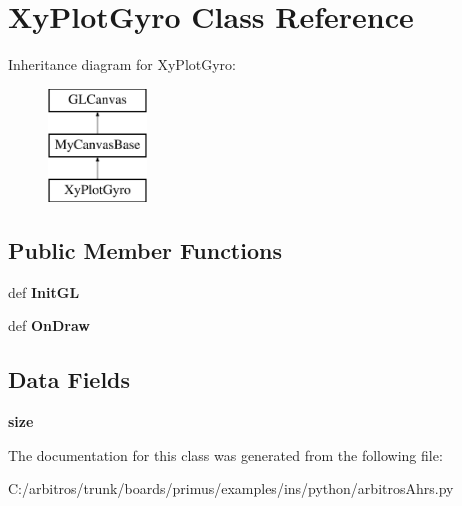 \hypertarget{classarbitros_ahrs_1_1_xy_plot_gyro}{\section{Xy\-Plot\-Gyro Class Reference}
\label{classarbitros_ahrs_1_1_xy_plot_gyro}
}
Inheritance diagram for Xy\-Plot\-Gyro\-:\begin{figure}[H]
\begin{center}
\leavevmode
\includegraphics[height=3.000000cm]{classarbitros_ahrs_1_1_xy_plot_gyro}
\end{center}
\end{figure}
\subsection*{Public Member Functions}
\begin{DoxyCompactItemize}
\item 
\hypertarget{classarbitros_ahrs_1_1_xy_plot_gyro_aa5d4da6894799e330c531fcff2320723}{def {\bfseries Init\-G\-L}}\label{classarbitros_ahrs_1_1_xy_plot_gyro_aa5d4da6894799e330c531fcff2320723}

\item 
\hypertarget{classarbitros_ahrs_1_1_xy_plot_gyro_a06264628fa709c57ac53fe3f63080317}{def {\bfseries On\-Draw}}\label{classarbitros_ahrs_1_1_xy_plot_gyro_a06264628fa709c57ac53fe3f63080317}

\end{DoxyCompactItemize}
\subsection*{Data Fields}
\begin{DoxyCompactItemize}
\item 
\hypertarget{classarbitros_ahrs_1_1_xy_plot_gyro_aa3d6656320f1a7278c0c2c7fdf07617c}{{\bfseries size}}\label{classarbitros_ahrs_1_1_xy_plot_gyro_aa3d6656320f1a7278c0c2c7fdf07617c}

\end{DoxyCompactItemize}


The documentation for this class was generated from the following file\-:\begin{DoxyCompactItemize}
\item 
C\-:/arbitros/trunk/boards/primus/examples/ins/python/arbitros\-Ahrs.\-py\end{DoxyCompactItemize}
